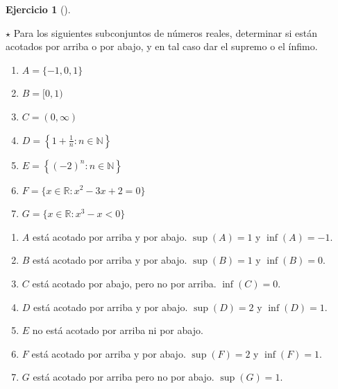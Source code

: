 \documentclass[
  a4paper,
]{scrreport}
\providecommand{\tightlist}{%
  \setlength{\itemsep}{0pt}\setlength{\parskip}{0pt}}\usepackage{longtable,booktabs,array}
\theoremstyle{definition}
\newtheorem{exercise}{Ejercicio}[chapter]
\theoremstyle{remark}
\begin{document}
\begin{exercise}[]\protect\hypertarget{exr-supremos-infimos-reales}{}\label{exr-supremos-infimos-reales}

\(\star\) Para los siguientes subconjuntos de números reales, determinar
si están acotados por arriba o por abajo, y en tal caso dar el supremo o
el ínfimo.

\begin{enumerate}
\def\labelenumi{\alph{enumi}.}
\tightlist
\item
  \(A = \{-1,0,1\}\)
\item
  \(B= [0,1)\)
\item
  \(C= (0,\infty)\)
\item
  \(D= \left\{1+\frac{1}{n}:n\in\mathbb{N}\right\}\)
\item
  \(E= \left\{(-2)^n:n\in\mathbb{N}\right\}\)
\item
  \(F= \{x\in\mathbb{R}:x^2-3x+2=0\}\)
\item
  \(G= \{x\in\mathbb{R}:x^3-x<0\}\)
\end{enumerate}

\end{exercise}

\begin{tcolorbox}[enhanced jigsaw, coltitle=black, toptitle=1mm, colframe=quarto-callout-tip-color-frame, colbacktitle=quarto-callout-tip-color!10!white, breakable, opacityback=0, bottomtitle=1mm, opacitybacktitle=0.6, title=\textcolor{quarto-callout-tip-color}{\faLightbulb}\hspace{0.5em}{Solución}, arc=.35mm, leftrule=.75mm, toprule=.15mm, titlerule=0mm, bottomrule=.15mm, left=2mm, rightrule=.15mm, colback=white]

\begin{enumerate}
\def\labelenumi{\alph{enumi}.}
\item
  \(A\) está acotado por arriba y por abajo. \(\sup(A)=1\) y
  \(\inf(A)=-1\).
\item
  \(B\) está acotado por arriba y por abajo. \(\sup(B)=1\) y
  \(\inf(B)=0\).
\item
  \(C\) está acotado por abajo, pero no por arriba. \(\inf(C)=0\).
\item
  \(D\) está acotado por arriba y por abajo. \(\sup(D)=2\) y
  \(\inf(D)=1\).
\item
  \(E\) no está acotado por arriba ni por abajo.
\item
  \(F\) está acotado por arriba y por abajo. \(\sup(F)=2\) y
  \(\inf(F)=1\).
\item
  \(G\) está acotado por arriba pero no por abajo. \(\sup(G)=1\).
\end{enumerate}

\end{tcolorbox}
\end{document}
